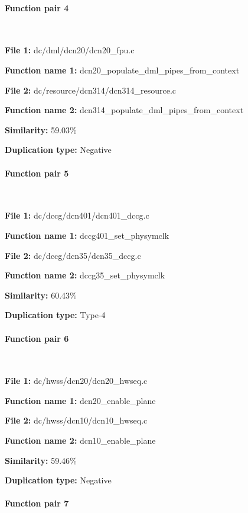 \paragraph{Function pair 4 }  

\

\textbf{File 1:} dc/dml/dcn20/dcn20\_fpu.c

\textbf{Function name 1:} dcn20\_populate\_dml\_pipes\_from\_context

\textbf{File 2:} dc/resource/dcn314/dcn314\_resource.c

\textbf{Function name 2:} dcn314\_populate\_dml\_pipes\_from\_context

\textbf{Similarity:} 59.03\%

\textbf{Duplication type:} Negative


\paragraph{Function pair 5 }  

\

\textbf{File 1:} dc/dccg/dcn401/dcn401\_dccg.c

\textbf{Function name 1:} dccg401\_set\_physymclk

\textbf{File 2:} dc/dccg/dcn35/dcn35\_dccg.c

\textbf{Function name 2:} dccg35\_set\_physymclk

\textbf{Similarity:} 60.43\%

\textbf{Duplication type:} Type-4


\paragraph{Function pair 6 }  

\

\textbf{File 1:} dc/hwss/dcn20/dcn20\_hwseq.c

\textbf{Function name 1:} dcn20\_enable\_plane

\textbf{File 2:} dc/hwss/dcn10/dcn10\_hwseq.c

\textbf{Function name 2:} dcn10\_enable\_plane

\textbf{Similarity:} 59.46\%

\textbf{Duplication type:} Negative


\paragraph{Function pair 7 }  

